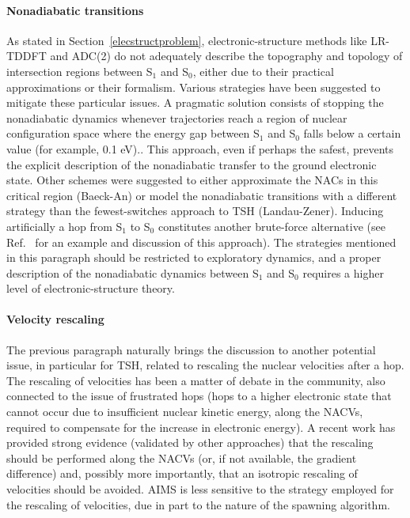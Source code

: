 \documentclass[9pt,bestpractices,pubversion]{livecoms}
\begin{document}
\paragraph{Nonadiabatic transitions} 

As stated in Section~\ref{elecstructproblem}, electronic-structure methods like LR-TDDFT and ADC(2) do not adequately describe the topography and topology of intersection regions between S$_1$ and S$_0$, either due to their practical approximations or their formalism. Various strategies have been suggested to mitigate these particular issues. A pragmatic solution consists of stopping the nonadiabatic dynamics whenever trajectories reach a region of nuclear configuration space where the energy gap between S$_1$ and S$_0$ falls below a certain value (for example, 0.1 eV).\cite{crespo-otero2011,plasser2014surface}. This approach, even if perhaps the safest, prevents the explicit description of the nonadiabatic transfer to the ground electronic state. Other schemes were suggested to either approximate the NACs in this critical region (Baeck-An\cite{baeck-an2017,do2022fewest}) or model the nonadiabatic transitions with a different strategy than the fewest-switches approach to TSH (Landau-Zener\cite{belyaev2011nonadiabatic,slavicek2020}). Inducing artificially a hop from S$_1$ to S$_0$ constitutes another brute-force alternative (see Ref.~ for an example and discussion of this approach). The strategies mentioned in this paragraph should be restricted to exploratory dynamics, and a proper description of the nonadiabatic dynamics between S$_1$ and S$_0$ requires a higher level of electronic-structure theory. 

\paragraph{Velocity rescaling}

The previous paragraph naturally brings the discussion to another potential issue, in particular for TSH, related to rescaling the nuclear velocities after a hop. The rescaling of velocities has been a matter of debate in the community, also connected to the issue of frustrated hops (hops to a higher electronic state that cannot occur due to insufficient nuclear kinetic energy, along the NACVs, required to compensate for the increase in electronic energy).\cite{fang99b,huang2023,subotnik2016understanding} A recent work has provided strong evidence (validated by other approaches\cite{Mannouch2023}) that the rescaling should be performed along the NACVs (or, if not available, the gradient difference) and, possibly more importantly, that an isotropic rescaling of velocities should be avoided.\cite{toldo2024velresc} AIMS is less sensitive to the strategy employed for the rescaling of velocities, due in part to the nature of the spawning algorithm.\cite{ibele2020} 
\end{document}
